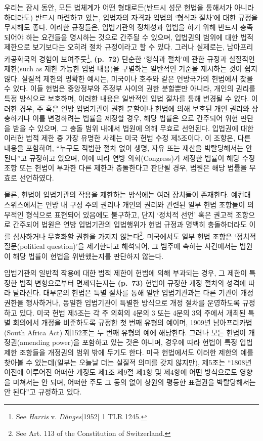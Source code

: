 우리는 잠시 동안, 모든 법체계가 어떤 형태로든(반드시 성문 헌법을
통해서가 아니라 하더라도) 반드시 마련하고 있는, 입법자의 자격과 입법의
`형식과 절차'에 대한 규정을 무시해도 좋다. 이러한 규정들은, 입법기관의
정체성과 입법을 하기 위해 반드시 충족되어야 하는 요건들을 명시하는
것으로 간주될 수 있으며, 입법권의 범위에 대한 법적 제한으로 보기보다는
오히려 절차 규정이라고 할 수 있다. 그러나 실제로는, 남아프리카공화국의
경험이 보여주듯\footnote{See \emph{Harris} v. \emph{Dönges}{[}1952{]} 1
  TLR 1245.}, \textbf{(p.~72)} 단순한 `형식과 절차'에 관한 규정과
실질적인 제한(such as 제한 가능한 입법 내용)을 구별하는 일반적인 기준을
제시하는 것이 쉽지 않다. 실질적 제한의 명확한 예시는, 미국이나 호주와
같은 연방국가의 헌법에서 찾을 수 있다. 이들 헌법은 중앙정부와 주정부
사이의 권한 분할뿐만 아니라, 개인의 권리를 특정 방식으로 보호하며,
이러한 내용은 일반적인 입법 절차를 통해 변경될 수 없다. 이러한 경우, 주
혹은 연방 입법기관이 권한 분할이나 헌법에 의해 보호된 개인 권리와
상충하거나 이를 변경하려는 법률을 제정할 경우, 해당 법률은 으로 간주되어 위헌 판단을 받을 수 있으며, 그 충돌 범위
내에서 법원에 의해 무효로 선언된다. 입법권에 대한 이러한 법적 제한 중
가장 유명한 사례는 미국 헌법 수정 제5조이다. 이 조항은, 다른 내용을
포함하여, ``누구도 적법한 절차 없이 생명, 자유 또는 재산을 박탈당해서는
안 된다''고 규정하고 있으며, 이에 따라 연방 의회(Congress)가 제정한
법률이 해당 수정 조항 또는 헌법이 부과한 다른 제한과 충돌한다고 판단될
경우, 법원은 해당 법률을 무효로 선언하였다.

물론, 헌법이 입법기관의 작용을 제한하는 방식에는 여러 장치들이 존재한다.
예컨대 스위스에서는 연방 내 구성 주의 권리나 개인의 권리와 관련된 일부
헌법 조항들이 의무적인 형식으로 표현되어 있음에도 불구하고, 단지 `정치적
선언' 혹은 권고적 조항으로 간주되어 법원은 연방 입법기관의 입법행위가
헌법 규정과 명백히 충돌하더라도 이를 심사하거나 무효화할 권한을 가지지
않는다\footnote{See Art. 113 of the Constitution of Switzerland.}.
미국에서도 일부 헌법 조항은 `정치적 질문(political question)'을
제기한다고 해석되어, 그 범주에 속하는 사건에서는 법원이 해당 법률이
헌법을 위반했는지를 판단하지 않는다.

입법기관의 일반적 작용에 대한 법적 제한이 헌법에 의해 부과되는 경우, 그
제한이 특정한 법적 변형으로부터 면제되는지는 \textbf{(p.~73)} 헌법이
규정한 개정 절차의 성격에 따라 달라진다. 대부분의 헌법은 특별 절차를
통해 일반 입법기관과는 다른 기관이 개정 권한을 행사하거나, 동일한
입법기관이 특별한 방식으로 개정 절차를 운영하도록 규정하고 있다. 미국
헌법 제5조는 각 주 의회의 4분의 3 또는 4분의 3의 주에서 개최된 특별
회의에서 개정을 비준하도록 규정한 첫 번째 유형의 예이며, 1909년
남아프리카법(South Africa Act) 제152조는 두 번째 유형의 예에 해당한다.
그러나 모든 헌법이 개정권(amending power)을 포함하고 있는 것은 아니며,
경우에 따라 헌법이 특정 입법 제한 조항들을 개정권의 범위 밖에 두기도
한다. 미국 헌법에서도 이러한 제한의 예를 찾아볼 수 있는데(일부는 오늘날
더는 실질적 의미를 갖지 않지만), 제5조는 ``1808년 이전에 이루어진 어떠한
개정도 제1조 제9절 제1항 및 제4항에 어떤 방식으로도 영향을 미쳐서는 안
되며, 어떠한 주도 그 동의 없이 상원의 평등한 표결권을 박탈당해서는 안
된다''고 규정하고 있다.

